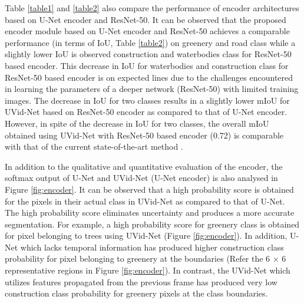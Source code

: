 \documentclass[journal]{IEEEtran}
\begin{document}
Table \ref{table1} and \ref{table2} also compare the performance of encoder architectures based on U-Net encoder and ResNet-50. It can be observed that the proposed encoder module based on U-Net encoder and ResNet-50 achieves a comparable performance (in terms of IoU, Table \ref{table2}) on greenery and road class while a slightly lower IoU is observed construction and waterbodies class for ResNet-50 based encoder. This decrease in IoU for waterbodies and construction class for ResNet-50 based encoder is on expected lines due to the challenges encountered in learning the parameters of a deeper network (ResNet-50) with limited training images. The decrease in IoU for two classes results in a slightly lower mIoU for UVid-Net based on ResNet-50 encoder as compared to that of U-Net encoder. However, in spite of the decrease in IoU for two classes, the overall mIoU obtained using UVid-Net with ResNet-50 based encoder (0.72) is comparable with that of the current state-of-the-art method \cite{22}.

In addition to the qualitative and quantitative evaluation of the encoder, the softmax output of U-Net and UVid-Net (U-Net encoder) is also analysed in Figure \ref{fig:encoder}. It can be observed that a high probability score is obtained for the pixels in their actual class in UVid-Net as compared to that of U-Net. The high probability score eliminates uncertainty and produces a more accurate segmentation. For example, a high probability score for greenery class is obtained for pixel belonging to trees using UVid-Net (Figure \ref{fig:encoder}). In addition, U-Net which lacks temporal information has produced higher construction class probability for pixel belonging to greenery at the boundaries (Refer the 6 $\times$ 6 representative regions in Figure \ref{fig:encoder}). In contrast, the UVid-Net which utilizes features propagated from the previous frame has produced very low construction class probability for greenery pixels at the class boundaries. 
\end{document}

